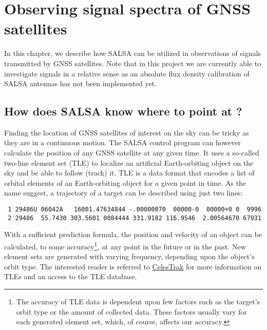 \chapter{Observing signal spectra of GNSS satellites}
In this chapter, we describe how SALSA can be utilized in observations of signals 
transmitted by GNSS satellites. Note that in this project we are currently able to investigate signals 
in a relative sense as an absolute flux density calibration of SALSA antennas has not been implemented yet.


\section{How does SALSA know where to point at ?}
Finding the location of GNSS satellites of interest on the sky can be tricky as they are in a continuous motion. The SALSA control 
program can however calculate the position of any GNSS satellite at any given time. It uses a so-called two-line element set 
(TLE) to localize an artificial Earth-orbiting object on the sky and be able to follow (track) it. 
TLE is a data format that encodes a list of orbital elements of an Earth-orbiting object for a given point in time.
As the name suggest, a trajectory of a target can be described using just two lines:
\begin{verbatim}
 1 29486U 06042A   16001.47634844 -.00000070  00000-0  00000+0 0  9996
 2 29486  55.7430 303.5601 0084444 331.9182 116.9546  2.00564670 67931
\end{verbatim}
With a sufficient prediction formula, the position and velocity of an object can be calculated, to some accuracy\footnote{The accuracy of TLE data is dependent upon few factors such as the target's orbit type or the amount 
of collected data. These factors usually vary for each generated element set, which, of course, affects our accuracy.}, at any point in the future or in the past. New element sets are generated with varying frequency, 
depending upon the object's orbit type. The interested reader is referred to \href{https://celestrak.com/}{CelesTrak} for more information on TLEs and an access to the TLE database.

